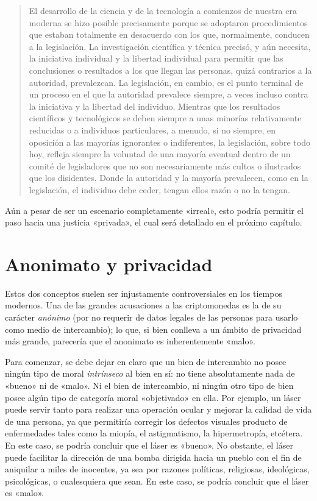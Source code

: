\documentclass[12pt,a4paper,twoside]{book}
\begin{document}
\begin{quotation}
El desarrollo de la ciencia y de la tecnología a comienzos de nuestra era moderna se hizo posible precisamente porque se adoptaron procedimientos que estaban totalmente en desacuerdo con los que, normalmente, conducen a la legislación. La investigación científica y técnica precisó, y aún necesita, la iniciativa individual y la libertad individual para permitir que las conclusiones o resultados a los que llegan las personas, quizá contrarios a la autoridad, prevalezcan. La legislación, en cambio, es el punto terminal de un proceso en el que la autoridad prevalece siempre, a veces incluso contra la iniciativa y la libertad del individuo. Mientras que los resultados científicos y tecnológicos se deben siempre a unas minorías relativamente reducidas o a individuos particulares, a menudo, si no siempre, en oposición a las mayorías ignorantes o indiferentes, la legislación, sobre todo hoy, refleja siempre la voluntad de una mayoría eventual dentro de un comité de legisladores que no son necesariamente más cultos o ilustrados que los disidentes. Donde la autoridad y la mayoría prevalecen, como en la legislación, el individuo debe ceder, tengan ellos razón o no la tengan. \cite[pág. 24]{brunoleoni:ley}
\end{quotation}

Aún a pesar de ser un escenario completamente «irreal», esto podría permitir el paso hacia una justicia «privada», el cual será detallado en el próximo capítulo.

\section{Anonimato y privacidad}
Estos dos conceptos suelen ser injustamente controversiales en los tiempos modernos. Una de las grandes acusaciones a las criptomonedas es la de su carácter \textit{anónimo} (por no requerir de datos legales de las personas para usarlo como medio de intercambio); lo que, si bien conlleva a un ámbito de privacidad más grande, parecería que el anonimato es inherentemente «malo».

Para comenzar, se debe dejar en claro que un bien de intercambio no posee ningún tipo de moral \textit{intrínseco} al bien en sí: no tiene absolutamente nada de «bueno» ni de «malo». Ni el bien de intercambio, ni ningún otro tipo de bien posee algún tipo de categoría moral «objetivado» en ella. Por ejemplo, un láser puede servir tanto para realizar una operación ocular y mejorar la calidad de vida de una persona, ya que permitiría corregir los defectos visuales producto de enfermedades tales como la miopía, el astigmatismo, la hipermetropía, etcétera. En este caso, se podría concluir  que el láser es «bueno». No obstante, el láser puede facilitar la dirección de una bomba dirigida hacia un pueblo con el fin de aniquilar a miles de inocentes, ya sea por razones políticas, religiosas, ideológicas, psicológicas, o cualesquiera que sean. En este caso, se podría concluir que el láser es «malo».
\end{document}
